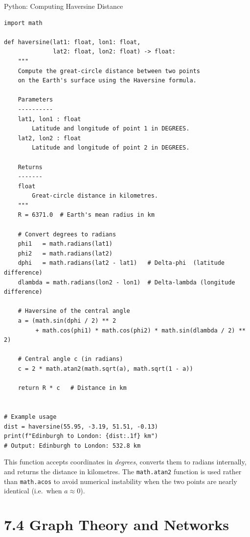 \documentclass[aspectratio=169,10pt]{beamer}
\begin{document}
\begin{frame}[fragile]{Python: Computing Haversine Distance}

\begin{lstlisting}[caption={Haversine distance function in Python}]
import math

def haversine(lat1: float, lon1: float,
              lat2: float, lon2: float) -> float:
    """
    Compute the great-circle distance between two points
    on the Earth's surface using the Haversine formula.

    Parameters
    ----------
    lat1, lon1 : float
        Latitude and longitude of point 1 in DEGREES.
    lat2, lon2 : float
        Latitude and longitude of point 2 in DEGREES.

    Returns
    -------
    float
        Great-circle distance in kilometres.
    """
    R = 6371.0  # Earth's mean radius in km

    # Convert degrees to radians
    phi1   = math.radians(lat1)
    phi2   = math.radians(lat2)
    dphi   = math.radians(lat2 - lat1)   # Delta-phi  (latitude difference)
    dlambda = math.radians(lon2 - lon1)  # Delta-lambda (longitude difference)

    # Haversine of the central angle
    a = (math.sin(dphi / 2) ** 2
         + math.cos(phi1) * math.cos(phi2) * math.sin(dlambda / 2) ** 2)

    # Central angle c (in radians)
    c = 2 * math.atan2(math.sqrt(a), math.sqrt(1 - a))

    return R * c   # Distance in km


# Example usage
dist = haversine(55.95, -3.19, 51.51, -0.13)
print(f"Edinburgh to London: {dist:.1f} km")
# Output: Edinburgh to London: 532.8 km
\end{lstlisting}

  This function accepts coordinates in \emph{degrees}, converts them to
  radians internally, and returns the distance in kilometres.
  The \texttt{math.atan2} function is used rather than \texttt{math.acos}
  to avoid numerical instability when the two points are nearly identical
  (i.e.\ when $a \approx 0$).

\end{frame}

\section{7.4 Graph Theory and Networks}
\end{document}
